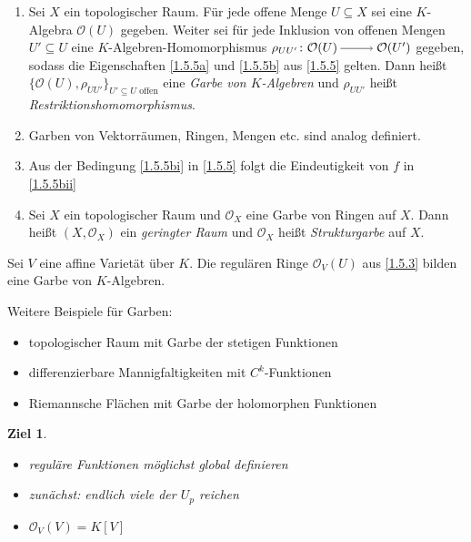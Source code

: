 \documentclass[a4paper,12pt]{scrbook}
\theoremstyle{keinenummern} %
\newtheorem{ziel}{Ziel}
\theoremstyle{mitnummern}
\theoremstyle{unserbeweis}
\def\O{\mathcal{O}}
\newcommand{\ra}{\raisebox{-1pt}{\tikz{\draw[thin,shorten >=3pt, ->] (0,0) node{\hspace*{-2pt}} -- node{} (1,0);}}\penalty1000\relax}
\begin{document}
\begin{dfn}\label{1.5.6}
  \begin{enumerate}
  \item Sei $X$ ein topologischer Raum. Für jede offene Menge $U\subseteq X$ sei eine $K$-Algebra $\O(U)$ gegeben. Weiter sei
    für jede Inklusion von offenen Mengen $U'\subseteq U$ eine $K$-Algebren-Homomorphismus $\rho_{UU'}\colon\O(U)\ra\O(U')$
    gegeben, sodass die Eigenschaften \ref{1.5.5a} und \ref{1.5.5b} aus \cref{1.5.5} gelten. Dann heißt
    $\{\O(U),\rho_{UU'}\}_{U'\subseteq U\text{ offen}}$ eine \emph{Garbe von $K$-Algebren} und $\rho_{UU'}$ heißt
    \emph{Restriktionshomomorphismus}.
  \item Garben von Vektorräumen, Ringen, Mengen etc. sind analog definiert.
  \item Aus der Bedingung \ref{1.5.5bi} in \cref{1.5.5} folgt die Eindeutigkeit von $f$ in \ref{1.5.5bii}
  \item Sei $X$ ein topologischer Raum und $\O_X$ eine Garbe von Ringen auf $X$. Dann heißt $(X,\O_X)$ ein \emph{geringter Raum}
    und $\O_X$ heißt \emph{Strukturgarbe} auf $X$.
  \end{enumerate}
\end{dfn}

\begin{bem}\label{1.5.7}
  Sei $V$ eine affine Varietät über $K$. Die regulären Ringe $\O_V(U)$ aus \cref{1.5.3} bilden eine Garbe von $K$-Algebren.
\end{bem}

\begin{bsp}\label{1.5.8}
  Weitere Beispiele für Garben:
  \begin{itemize}
  \item topologischer Raum mit Garbe der stetigen Funktionen
  \item differenzierbare Mannigfaltigkeiten mit $C^k$-Funktionen
  \item Riemannsche Flächen mit Garbe der holomorphen Funktionen
  \end{itemize}
\end{bsp}

\begin{ziel}
  \begin{itemize}
  \item reguläre Funktionen möglichst global definieren
  \item zunächst: endlich viele der $U_p$ reichen
  \item $\O_V(V)=K[V]$
  \end{itemize}
\end{ziel}
\end{document}
